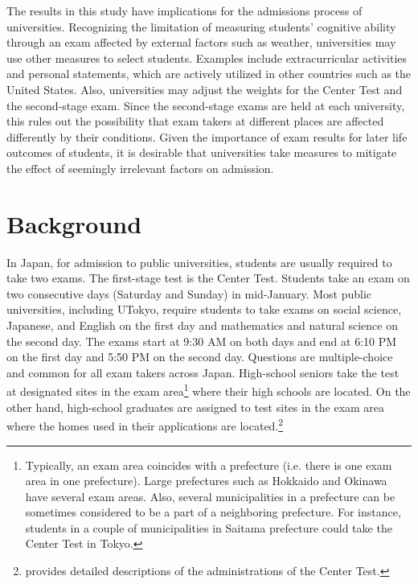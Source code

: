 \documentclass[12pt,letterpaper]{article}
\begin{document}
The results in this study have implications for the admissions process of universities.
Recognizing the limitation of measuring students' cognitive ability through an exam affected by external factors such as weather, universities may use other measures to select students.
Examples include extracurricular activities and personal statements, which are actively utilized in other countries such as the United States.
Also, universities may adjust the weights for the Center Test and the second-stage exam.
Since the second-stage exams are held at each university, this rules out the possibility that exam takers at different places are affected differently by their conditions.
Given the importance of exam results for later life outcomes of students, it is desirable that universities take measures to mitigate the effect of seemingly irrelevant factors on admission.

\clearpage



\appendix

\section{Background}\label{sec:background}

In Japan, for admission to public universities, students are usually required to take two exams.
The first-stage test is the Center Test.
Students take an exam on two consecutive days (Saturday and Sunday) in mid-January.
Most public universities, including UTokyo, require students to take exams on social science, Japanese, and English on the first day and mathematics and natural science on the second day.
The exams start at 9:30 AM on both days and end at 6:10 PM on the first day and 5:50 PM on the second day.
Questions are multiple-choice and common for all exam takers across Japan.
High-school seniors take the test at designated sites in the exam area\footnote{ \label{footnote:prefecture}
  Typically, an exam area coincides with a prefecture (i.e. there is one exam area in one prefecture).
  Large prefectures such as Hokkaido and Okinawa have several exam areas.
  Also, several municipalities in a prefecture can be sometimes considered to be a part of a neighboring prefecture.
  For instance, students in a couple of municipalities in Saitama prefecture could take the Center Test in Tokyo.
} where their high schools are located.
On the other hand, high-school graduates are assigned to test sites in the exam area where the homes used in their applications are located.\footnote{
  \citet{Watanabe2013} provides detailed descriptions of the administrations of the Center Test.
}
\end{document}

